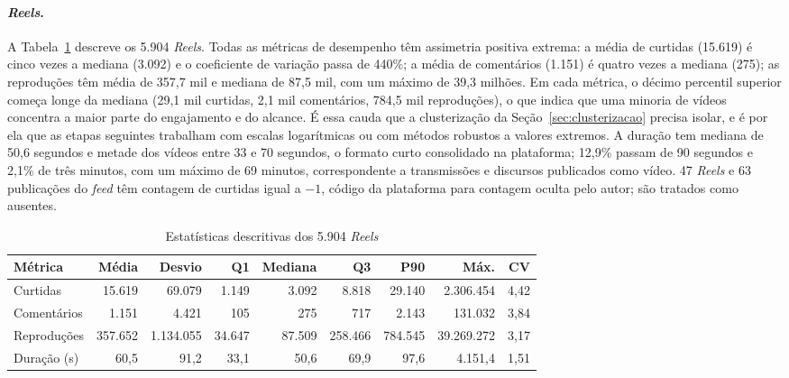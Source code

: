 \paragraph*{\emph{Reels}.} A Tabela~\ref{tab:estatisticas_reels} descreve os 5.904 \emph{Reels}. Todas as métricas de desempenho têm assimetria positiva extrema: a média de curtidas (15.619) é cinco vezes a mediana (3.092) e o coeficiente de variação passa de 440\%; a média de comentários (1.151) é quatro vezes a mediana (275); as reproduções têm média de 357,7 mil e mediana de 87,5 mil, com um máximo de 39,3 milhões. Em cada métrica, o décimo percentil superior começa longe da mediana (29,1 mil curtidas, 2,1 mil comentários, 784,5 mil reproduções), o que indica que uma minoria de vídeos concentra a maior parte do engajamento e do alcance. É essa cauda que a clusterização da Seção~\ref{sec:clusterizacao} precisa isolar, e é por ela que as etapas seguintes trabalham com escalas logarítmicas ou com métodos robustos a valores extremos. A duração tem mediana de 50,6 segundos e metade dos vídeos entre 33 e 70 segundos, o formato curto consolidado na plataforma; 12,9\% passam de 90 segundos e 2,1\% de três minutos, com um máximo de 69 minutos, correspondente a transmissões e discursos publicados como vídeo. 47 \emph{Reels} e 63 publicações do \emph{feed} têm contagem de curtidas igual a $-1$, código da plataforma para contagem oculta pelo autor; são tratados como ausentes.

\begin{table}[htb]
\centering
\caption{Estatísticas descritivas dos 5.904 \emph{Reels}}
\label{tab:estatisticas_reels}
\small
\setlength{\tabcolsep}{4pt}
\begin{tabular}{lrrrrrrrr}
\toprule
\textbf{Métrica} & \textbf{Média} & \textbf{Desvio} & \textbf{Q1} & \textbf{Mediana} & \textbf{Q3} & \textbf{P90} & \textbf{Máx.} & \textbf{CV} \\
\midrule
Curtidas & 15.619 & 69.079 & 1.149 & 3.092 & 8.818 & 29.140 & 2.306.454 & 4,42 \\
Comentários & 1.151 & 4.421 & 105 & 275 & 717 & 2.143 & 131.032 & 3,84 \\
Reproduções & 357.652 & 1.134.055 & 34.647 & 87.509 & 258.466 & 784.545 & 39.269.272 & 3,17 \\
Duração (s) & 60,5 & 91,2 & 33,1 & 50,6 & 69,9 & 97,6 & 4.151,4 & 1,51 \\
\bottomrule
\end{tabular}
\end{table}

